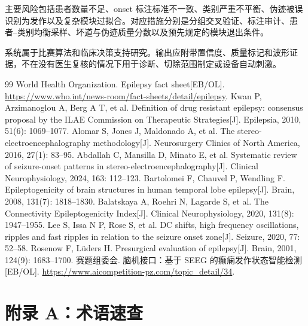 主要风险包括患者数量不足、onset 标注标准不一致、类别严重不平衡、伪迹被误识别为发作以及复杂模块过拟合。对应措施分别是分组交叉验证、标注审计、患者--类别均衡采样、坏道与伪迹质量分数以及预先规定的模块退出条件。

系统属于比赛算法和临床决策支持研究。输出应附带置信度、质量标记和波形证据，不在没有医生复核的情况下用于诊断、切除范围制定或设备自动刺激。

\begin{thebibliography}{99}
 World Health Organization. Epilepsy fact sheet[EB/OL]. \url{https://www.who.int/news-room/fact-sheets/detail/epilepsy}.
 Kwan P, Arzimanoglou A, Berg A T, et al. Definition of drug resistant epilepsy: consensus proposal by the ILAE Commission on Therapeutic Strategies[J]. Epilepsia, 2010, 51(6): 1069--1077.
 Alomar S, Jones J, Maldonado A, et al. The stereo-electroencephalography methodology[J]. Neurosurgery Clinics of North America, 2016, 27(1): 83--95.
 Abdallah C, Mansilla D, Minato E, et al. Systematic review of seizure-onset patterns in stereo-electroencephalography[J]. Clinical Neurophysiology, 2024, 163: 112--123.
 Bartolomei F, Chauvel P, Wendling F. Epileptogenicity of brain structures in human temporal lobe epilepsy[J]. Brain, 2008, 131(7): 1818--1830.
 Balatskaya A, Roehri N, Lagarde S, et al. The Connectivity Epileptogenicity Index[J]. Clinical Neurophysiology, 2020, 131(8): 1947--1955.
 Lee S, Issa N P, Rose S, et al. DC shifts, high frequency oscillations, ripples and fast ripples in relation to the seizure onset zone[J]. Seizure, 2020, 77: 52--58.
 Rosenow F, L\"uders H. Presurgical evaluation of epilepsy[J]. Brain, 2001, 124(9): 1683--1700.
 赛题组委会. 脑机接口：基于 SEEG 的癫痫发作状态智能检测[EB/OL]. \url{https://www.aicompetition-pz.com/topic_detail/34}.
\end{thebibliography}

\clearpage
\section*{附录 A：术语速查}

